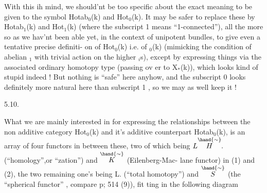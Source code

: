 With this ih mind, we should'nt be too specific  about the exact meaning
to be given to the symbol Hotab$_0$(k) and Hot$_0$(k). It may be safer 
to replace these by Hotab$_1$(k) and Hot$_1$(k) (where the subscript 1 means
``1-connected''), all the more so as we hav'nt been able yet, in the
context of unipotent bundles, to give even a tentative precise definiti-%
on of Hot$_0$(k) i.e. of $_0$(k) (mimicking the condition of abelian  \hand{$\pi$}$_1$
with trivial action on the higher \hand{$\pi$}$_i$s), except by expressing things
via the associated ordinary homotopy type (passing ov er to X$_*$(k)), which
looks kind of stupid indeed ! But nothing is ``safe'' here anyhow, and
the subscript 0 looks definitely more natural here than subscript 1 ,
so we may as well keep it !

5.10.

What we are mainly interested in\hand{,} for expressing the relationships
between the non additive category Hot$_0$(k) and it's additive counterpart
Hotab$_0$(k), is an array of four functors \hand{\unsure{,}}in between these, two of
which being $L\overset{\hand{\sim}}{H}.$ (``homology'',or ``zation'') and $\overset{\hand{\sim}}{K}$ (Eilenberg-Mac-%
lane functor) in (1) and (2), the two remaining one's being L\hand{$\pi$}. (``total
homotopy'') and $\overset{\hand{\sim}}{S}$ (the ``spherical functor'' , compare p; 514 (9)), fit%
ting in the following diagram


